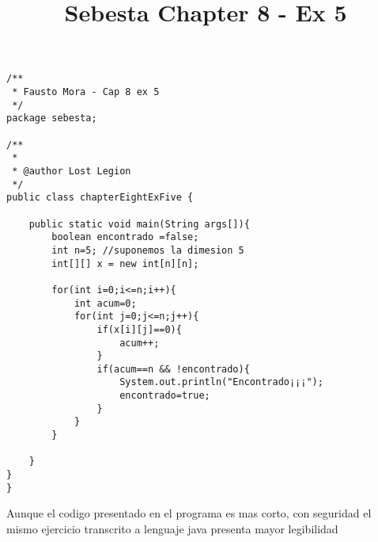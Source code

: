 \documentclass{article}
\begin{document}
\lstset{language=JAva}          %
\title{Sebesta Chapter 8 - Ex 5}
\begin{lstlisting}[frame=single]  % Start your code-block
/**
 * Fausto Mora - Cap 8 ex 5
 */
package sebesta;

/**
 *
 * @author Lost Legion
 */
public class chapterEightExFive {
    
    public static void main(String args[]){
        boolean encontrado =false;
        int n=5; //suponemos la dimesion 5
        int[][] x = new int[n][n];
        
        for(int i=0;i<=n;i++){
            int acum=0;
            for(int j=0;j<=n;j++){
                if(x[i][j]==0){
                    acum++;
                }
                if(acum==n && !encontrado){
                    System.out.println("Encontrado¡¡¡");
                    encontrado=true;
                }
            }      
        }
        
    }
}
}
\end{lstlisting}
Aunque el codigo presentado en el programa es mas corto, con seguridad el mismo ejercicio transcrito a lenguaje java presenta mayor legibilidad
\end{document}

